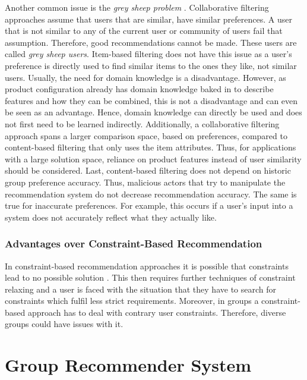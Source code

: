 Another common issue is the \emph{grey sheep problem} \cite{grasIdentifyingGreySheep2016}. Collaborative filtering approaches assume that users that are similar, have similar preferences. A user that is not similar to any of the current user or community of users fail that assumption. Therefore, good recommendations cannot be made. These users are called \emph{grey sheep users}. Item-based filtering does not have this issue as a user's preference is directly used to find similar items to the ones they like, not similar users.
Usually, the need for domain knowledge is a disadvantage. However, as product configuration already has domain knowledge baked in to describe features and how they can be combined, this is not a disadvantage and can even be seen as an advantage. Hence, domain knowledge can directly be used and does not first need to be learned indirectly.
Additionally, a collaborative filtering approach spans a larger comparison space, based on preferences, compared to content-based filtering that only uses the item attributes. Thus, for applications with a large solution space, reliance on product features instead of user similarity should be considered.
Last, content-based filtering does not depend on historic group preference accuracy. Thus, malicious actors that try to manipulate the recommendation system do not decrease recommendation accuracy. The same is true for inaccurate preferences. For example, this occurs if a user's input into a system does not accurately reflect what they actually like.

\subsubsection{Advantages over Constraint-Based Recommendation}

In constraint-based recommendation approaches it is possible that constraints lead to no possible solution \cite[~ p. 44]{felfernigAlgorithmsGroupRecommendation2018}. This then requires further techniques of constraint relaxing and a user is faced with the situation that they have to search for constraints which fulfil less strict requirements. Moreover, in groups a constraint-based approach has to deal with contrary user constraints. Therefore, diverse groups could have issues with it.

\section{Group Recommender System}
\label{sec:Foundations:GroupRecommenderSystem}

